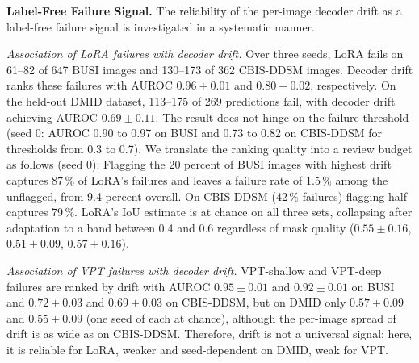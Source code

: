 \documentclass[runningheads]{llncs}
\begin{document}
\begin{table}[tbp]
  \centering
  \caption{AUROC for detecting per-image failures (Dice $<$ 0.5) at tight boxes, mean $\pm$ std over three seeds (single value: seed 0 only): decoder drift (Eq.~\eqref{eq:drift}) versus the decoder's IoU estimate. Cells with fewer than 20 failures omitted; drift is zero by construction for zero-shot.}
  \label{tab:detect}
  \resizebox{\linewidth}{!}{}
\end{table}

\textbf{Label-Free Failure Signal.} The reliability of the per-image decoder drift as a label-free failure signal is investigated in a systematic manner.

\emph{Association of LoRA failures with decoder drift.} Over three seeds, LoRA fails on 61--82 of 647 BUSI images and 130--173 of 362 CBIS-DDSM images. Decoder drift ranks these failures with AUROC $0.96 \pm 0.01$ and $0.80 \pm 0.02$, respectively. On the held-out DMID dataset, 113--175 of 269 predictions fail, with decoder drift achieving AUROC $0.69 \pm 0.11$. The result does not hinge on the failure threshold (seed 0: AUROC 0.90 to 0.97 on BUSI and 0.73 to 0.82 on CBIS-DDSM for thresholds from 0.3 to 0.7). We translate the ranking quality into a review budget as follows (seed 0): Flagging the 20 percent of BUSI images with highest drift captures 87\,\% of LoRA's failures and leaves a failure rate of 1.5\,\% among the unflagged, from 9.4 percent overall. On CBIS-DDSM (42\,\% failures) flagging half captures 79\,\%. LoRA's IoU estimate is at chance on all three sets, collapsing after adaptation to a band between 0.4 and 0.6 regardless of mask quality ($0.55 \pm 0.16$, $0.51 \pm 0.09$, $0.57 \pm 0.16$).

\emph{Association of VPT failures with decoder drift.} VPT-shallow and VPT-deep failures are ranked by drift with AUROC $0.95 \pm 0.01$ and $0.92 \pm 0.01$ on BUSI and $0.72 \pm 0.03$ and $0.69 \pm 0.03$ on CBIS-DDSM, but on DMID only $0.57 \pm 0.09$ and $0.55 \pm 0.09$ (one seed of each at chance), although the per-image spread of drift is as wide as on CBIS-DDSM. Therefore, drift is not a universal signal: here, it is reliable for LoRA, weaker and seed-dependent on DMID, weak for VPT.
\end{document}
